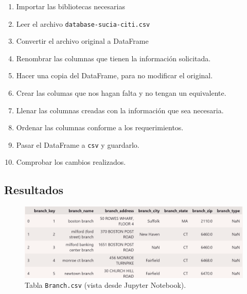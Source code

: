 \begin{enumerate}
    \item Importar las bibliotecas necesarias 
    \item Leer el archivo \texttt{database-sucia-citi.csv} 
    \item Convertir el archivo original a DataFrame
    \item Renombrar las columnas que tienen la información solicitada.
    \item Hacer una copia del DataFrame, para no modificar el original.
    \item Crear las columas que nos hagan falta y no tengan un equivalente.
    \item Llenar las columnas creadas con la información que sea necesaria. 
    \item Ordenar las columnas conforme a los requerimientos.
    \item Pasar el DataFrame a \texttt{csv} y guardarlo.
    \item Comprobar los cambios realizados.
\end{enumerate} 

\vspace{0.5 cm}



\vspace{0.5 cm}

\subsection*{Resultados}

\begin{figure}[H]
    \centering
    \includegraphics[width = 1\textwidth]{TablaBranch.png}
    \caption{Tabla \texttt{Branch.csv} (vista desde Jupyter Notebook).}
    \label{fig:TB}
\end{figure}

\newpage